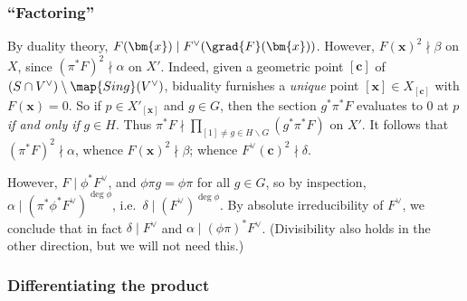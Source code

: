 \documentclass[12pt]{report}
\begin{document}
\subsubsection{``Factoring'' }

By duality theory,
$F(\bm{x})\mid F^\vee(\grad{F}(\bm{x}))$.
However,
$F(\bm{x})^2\nmid\beta$ on $X$,
since $(\pi^\ast{F})^2\nmid\alpha$ on $X'$.
Indeed,
given a geometric point $[\bm{c}]$ of $(S\cap V^\vee)\setminus\map{Sing}(V^\vee)$,
biduality furnishes a \emph{unique} point $[\bm{x}]\in X_{[\bm{c}]}$ with $F(\bm{x})=0$.
So if $p\in X'_{[\bm{x}]}$ and $g\in G$,
then the section $g^\ast\pi^\ast{F}$ evaluates to $0$ at $p$ \emph{if and only if} $g\in H$.
Thus $\pi^\ast{F}\nmid\prod_{[1]\neq g\in H\backslash G}(g^\ast\pi^\ast{F})$ on $X'$.
It follows that
$(\pi^\ast{F})^2\nmid\alpha$,
whence $F(\bm{x})^2\nmid\beta$;
whence $F^\vee(\bm{c})^2\nmid\delta$.

However,
$F\mid\phi^\ast{F^\vee}$,
and $\phi\pi g = \phi\pi$ for all $g\in G$,
so by inspection,
$\alpha\mid(\pi^\ast\phi^\ast{F^\vee})^{\deg\phi}$,
i.e.~$\delta\mid (F^\vee)^{\deg\phi}$.
By absolute irreducibility of $F^\vee$,
we conclude that
in fact $\delta\mid F^\vee$ and $\alpha\mid(\phi\pi)^\ast{F^\vee}$.
(Divisibility also holds in the other direction,
but we will not need this.)


\subsubsection{Differentiating the product}
\end{document}
